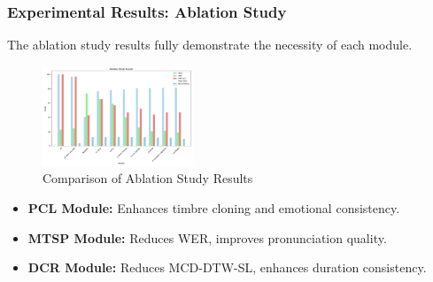 



\begin{frame}
\frametitle{Experimental Results: Ablation Study}
The ablation study results fully demonstrate the necessity of each module.

\begin{figure}
\centering
\includegraphics[width=0.4\textwidth]{figs/消融实验.png} 
\caption{Comparison of Ablation Study Results}
\end{figure}

\begin{itemize}
\item \textbf{PCL Module:} Enhances timbre cloning and emotional consistency.
\item \textbf{MTSP Module:} Reduces WER, improves pronunciation quality.
\item \textbf{DCR Module:} Reduces MCD-DTW-SL, enhances duration consistency.
\end{itemize}
\end{frame}